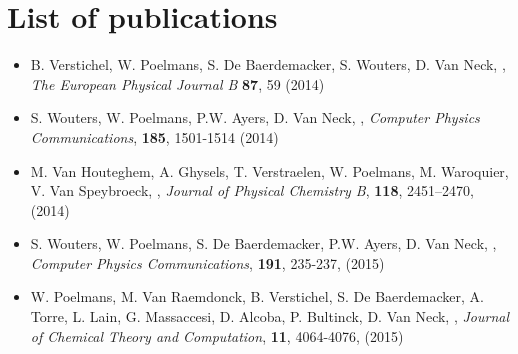 \chapter{List of publications}\label{app-papers}

\begin{itemize}
  \item B. Verstichel, W. Poelmans, S. De Baerdemacker, S. Wouters, D. Van Neck, 
      ,
      \textit{The European Physical Journal B} \textbf{87}, 59 (2014)
  \item  S. Wouters, W. Poelmans, P.W. Ayers, D. Van Neck,
      , 
      \textit{Computer Physics Communications}, \textbf{185}, 1501-1514 (2014)
  \item M. Van Houteghem, A. Ghysels, T. Verstraelen, W. Poelmans, M. Waroquier, V. Van Speybroeck,
      ,
      \textit{Journal of Physical Chemistry B}, \textbf{118}, 2451–2470, (2014)
  \item S. Wouters, W. Poelmans, S. De Baerdemacker, P.W. Ayers, D. Van Neck,
      ,
      \textit{Computer Physics Communications}, \textbf{191}, 235-237, (2015)
  \item W. Poelmans, M. Van Raemdonck, B. Verstichel, S. De Baerdemacker, A. Torre, L. Lain, G. Massaccesi, D. Alcoba, P. Bultinck,  D. Van Neck, 
      ,
      \textit{Journal of Chemical Theory and Computation}, \textbf{11}, 4064-4076, (2015) 
\end{itemize}

